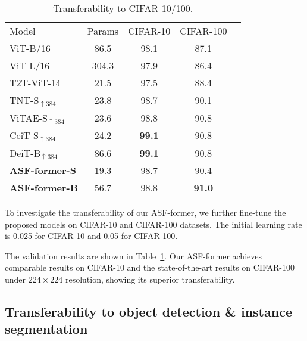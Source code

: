 \documentclass[lettersize,journal]{IEEEtran}
\begin{document}
\setlength{\tabcolsep}{4pt}
\begin{table}
\begin{center}
\caption{Transferability to CIFAR-10/100.}
\label{table:generalization}
\begin{tabular}{lcccc}
\hline\noalign{\smallskip}
Model &Params &CIFAR-10 &CIFAR-100\\
\noalign{\smallskip}
\hline
\noalign{\smallskip}
ViT-B/16 \cite{dosovitskiy2021an} & 86.5 & 98.1 & 87.1\\
ViT-L/16 \cite{dosovitskiy2021an} & 304.3 & 97.9 & 86.4\\
T2T-ViT-14 \cite{yuan2021tokens} &21.5 &97.5 &88.4 \\
TNT-S$_{\uparrow384}$ \cite{tnt} &23.8 &98.7 &90.1\\
ViTAE-S$_{\uparrow384}$ \cite{Xu2021ViTAEVT} &23.6 &98.8 &90.8 \\
CeiT-S$_{\uparrow384}$ \cite{Yuan2021IncorporatingCD}  &24.2 &\textbf{99.1} &90.8\\
DeiT-B$_{\uparrow384}$ \cite{Touvron2021TrainingDI} & 86.6 & \textbf{99.1} & 90.8\\

\midrule
\textbf{ASF-former-S} &19.3 &98.7 &90.4 \\
\textbf{ASF-former-B} &56.7 &98.8 &\textbf{91.0} \\
\hline
\end{tabular}
\end{center}
\end{table}
\setlength{\tabcolsep}{1.4pt}

To investigate the transferability of our ASF-former, we further fine-tune the proposed models on CIFAR-10 and CIFAR-100 datasets. The initial learning rate is 0.025 for CIFAR-10 and 0.05 for CIFAR-100.

The validation results are shown in Table~\ref{table:generalization}. Our ASF-former achieves comparable results on CIFAR-10 and the state-of-the-art results on CIFAR-100 under $224 \times 224$ resolution, showing its superior transferability.

\subsection{Transferability to object detection \& instance segmentation}
\label{detection}
\end{document}
